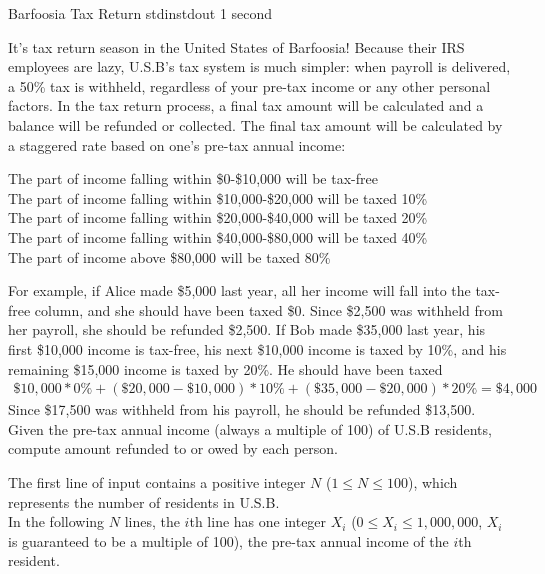 \begin{problem}{Barfoosia Tax Return}
{stdin}{stdout}
{1 second}{}{}

It's tax return season in the United States of Barfoosia! Because their IRS employees are lazy, U.S.B's tax system is much simpler: when payroll is delivered, a 50\% tax is withheld, regardless of your pre-tax income or any other personal factors. In the tax return process, a final tax amount will be calculated and a balance will be refunded or collected. The final tax amount will be calculated by a staggered rate based on one's pre-tax annual income: 
\begin{center}
	The part of income falling within \$0-\$10,000 will be tax-free \\
	The part of income falling within \$10,000-\$20,000 will be taxed 10\% \\
	The part of income falling within \$20,000-\$40,000 will be taxed 20\% \\
	The part of income falling within \$40,000-\$80,000 will be taxed 40\% \\
	The part of income above \$80,000 will be taxed 80\% 
\end{center}

For example, if Alice made \$5,000 last year, all her income will fall into the tax-free column, and she should have been taxed \$0. Since \$2,500 was withheld from her payroll, she should be refunded \$2,500. If Bob made \$35,000 last year, his first \$10,000 income is tax-free, his next \$10,000 income is taxed by 10\%, and his remaining \$15,000 income is taxed by 20\%. He should have been taxed
\begin{align*}
	\$10,000 * 0\% + (\$20,000 - \$10,000) * 10\% + (\$35,000 - \$20,000) * 20\% = \$4,000
\end{align*}
Since \$17,500 was withheld from his payroll, he should be refunded \$13,500. \\

Given the pre-tax annual income (always a multiple of 100) of U.S.B residents, compute amount refunded to or owed by each person. 

\InputFile

The first line of input contains a positive integer $N$ ($1 \le N \le 100$), which represents the number of residents in U.S.B. \\
In the following $N$ lines, the $i$th line has one integer $X_i$ ($0 \le X_i \le 1,000,000$, $X_i$ is guaranteed to be a multiple of 100), the pre-tax annual income of the $i$th resident. 


\end{problem}
